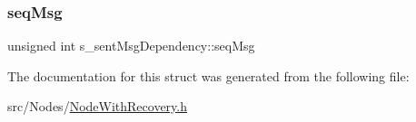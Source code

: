 \subsubsection{\texorpdfstring{seq\+Msg}{seqMsg}}
{\footnotesize\ttfamily unsigned int s\+\_\+sent\+Msg\+Dependency\+::seq\+Msg}



The documentation for this struct was generated from the following file\+:\begin{DoxyCompactItemize}
\item 
src/\+Nodes/\hyperlink{NodeWithRecovery_8h}{Node\+With\+Recovery.\+h}\end{DoxyCompactItemize}
